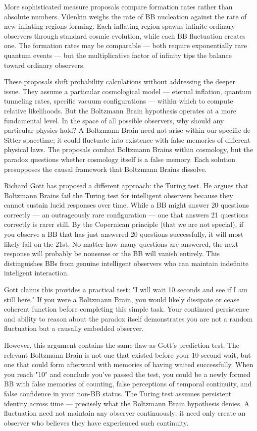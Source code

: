More sophisticated measure proposals compare formation rates rather than absolute numbers. Vilenkin weighs the rate of BB nucleation against the rate of new inflating regions forming. Each inflating region spawns infinite ordinary observers through standard cosmic evolution, while each BB fluctuation creates one. The formation rates may be comparable — both require exponentially rare quantum events — but the multiplicative factor of infinity tips the balance toward ordinary observers.

These proposals shift probability calculations without addressing the deeper issue. They assume a particular cosmological model — eternal inflation, quantum tunneling rates, specific vacuum configurations — within which to compute relative likelihoods. But the Boltzmann Brain hypothesis operates at a more fundamental level. In the space of all possible observers, why should any particular physics hold? A Boltzmann Brain need not arise within our specific de Sitter spacetime; it could fluctuate into existence with false memories of different physical laws. The proposals combat Boltzmann Brains within cosmology, but the paradox questions whether cosmology itself is a false memory. Each solution presupposes the causal framework that Boltzmann Brains dissolve.

Richard Gott has proposed a different approach: the Turing test. He argues that Boltzmann Brains fail the Turing test for intelligent observers because they cannot sustain lucid responses over time. While a BB might answer 20 questions correctly — an outrageously rare configuration — one that answers 21 questions correctly is rarer still. By the Copernican principle (that we are not special), if you observe a BB that has just answered 20 questions successfully, it will most likely fail on the 21st. No matter how many questions are answered, the next response will probably be nonsense or the BB will vanish entirely. This distinguishes BBs from genuine intelligent observers who can maintain indefinite inteligent interaction.

Gott claims this provides a practical test: "I will wait 10 seconds and see if I am still here." If you were a Boltzmann Brain, you would likely dissipate or cease coherent function before completing this simple task. Your continued persistence and ability to reason about the paradox itself demonstrates you are not a random fluctuation but a causally embedded observer.

However, this argument contains the same flaw as Gott's prediction test. The relevant Boltzmann Brain is not one that existed before your 10-second wait, but one that could form afterward with memories of having waited successfully. When you reach "10" and conclude you've passed the test, you could be a newly formed BB with false memories of counting, false perceptions of temporal continuity, and false confidence in your non-BB status. The Turing test assumes persistent identity across time — precisely what the Boltzmann Brain hypothesis denies. A fluctuation need not maintain any observer continuously; it need only create an observer who believes they have experienced such continuity.

